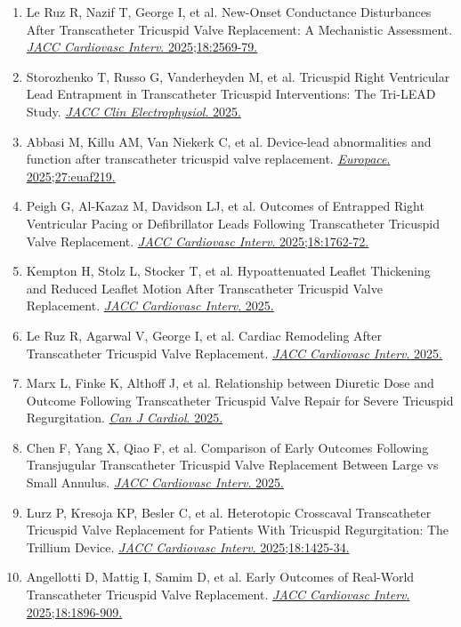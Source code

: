 \documentclass[12pt,a4paper]{article}
\begin{document}
\begin{enumerate}
    \item Le Ruz R, Nazif T, George I, et al. New-Onset Conductance Disturbances After Transcatheter Tricuspid Valve Replacement: A Mechanistic Assessment. \href{https://doi.org/10.1016/j.jcin.2025.07.039}{\textit{JACC Cardiovasc Interv}. 2025;18:2569-79.}

    \item Storozhenko T, Russo G, Vanderheyden M, et al. Tricuspid Right Ventricular Lead Entrapment in Transcatheter Tricuspid Interventions: The Tri-LEAD Study. \href{https://doi.org/10.1016/j.jacep.2025.11.003}{\textit{JACC Clin Electrophysiol}. 2025.}

    \item Abbasi M, Killu AM, Van Niekerk C, et al. Device-lead abnormalities and function after transcatheter tricuspid valve replacement. \href{https://doi.org/10.1093/europace/euaf219}{\textit{Europace}. 2025;27:euaf219.}

    \item Peigh G, Al-Kazaz M, Davidson LJ, et al. Outcomes of Entrapped Right Ventricular Pacing or Defibrillator Leads Following Transcatheter Tricuspid Valve Replacement. \href{https://doi.org/10.1016/j.jcin.2025.05.042}{\textit{JACC Cardiovasc Interv}. 2025;18:1762-72.}

    \item Kempton H, Stolz L, Stocker T, et al. Hypoattenuated Leaflet Thickening and Reduced Leaflet Motion After Transcatheter Tricuspid Valve Replacement. \href{https://doi.org/10.1016/j.jcin.2025.10.026}{\textit{JACC Cardiovasc Interv}. 2025.}

    \item Le Ruz R, Agarwal V, George I, et al. Cardiac Remodeling After Transcatheter Tricuspid Valve Replacement. \href{https://doi.org/10.1016/j.jcin.2025.10.023}{\textit{JACC Cardiovasc Interv}. 2025.}

    \item Marx L, Finke K, Althoff J, et al. Relationship between Diuretic Dose and Outcome Following Transcatheter Tricuspid Valve Repair for Severe Tricuspid Regurgitation. \href{https://doi.org/10.1016/j.cjca.2025.12.014}{\textit{Can J Cardiol}. 2025.}

    \item Chen F, Yang X, Qiao F, et al. Comparison of Early Outcomes Following Transjugular Transcatheter Tricuspid Valve Replacement Between Large vs Small Annulus. \href{https://doi.org/10.1016/j.jcin.2025.11.013}{\textit{JACC Cardiovasc Interv}. 2025.}

    \item Lurz P, Kresoja KP, Besler C, et al. Heterotopic Crosscaval Transcatheter Tricuspid Valve Replacement for Patients With Tricuspid Regurgitation: The Trillium Device. \href{https://doi.org/10.1016/j.jcin.2025.04.036}{\textit{JACC Cardiovasc Interv}. 2025;18:1425-34.}

    \item Angellotti D, Mattig I, Samim D, et al. Early Outcomes of Real-World Transcatheter Tricuspid Valve Replacement. \href{https://doi.org/10.1016/j.jcin.2025.06.002}{\textit{JACC Cardiovasc Interv}. 2025;18:1896-909.}
\end{enumerate}
\end{document}
